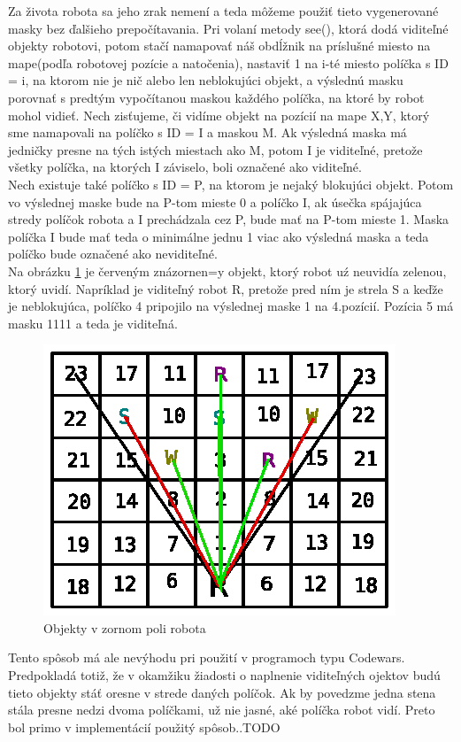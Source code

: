 Za života robota sa jeho zrak nemení a teda môžeme použiť tieto vygenerované masky bez ďalšieho prepočítavania. Pri volaní metody see(), ktorá dodá viditeľné objekty robotovi, potom stačí namapovať náš obdĺžnik na príslušné miesto na mape(podľa robotovej pozície a natočenia), nastaviť 1 na i-té miesto políčka s ID = i, na ktorom nie je nič alebo len neblokujúci objekt, a výslednú masku porovnať s predtým vypočítanou maskou každého políčka, na ktoré by robot mohol vidieť. Nech zisťujeme, či vidíme objekt na pozícií na mape X,Y, ktorý sme namapovali na políčko s ID = I a maskou M. Ak výsledná maska má jedničky presne na tých istých miestach ako M, potom I je viditeľné, pretože všetky políčka, na ktorých I záviselo, boli označené ako viditeľné. \\
Nech existuje také políčko s ID = P, na ktorom je nejaký blokujúci objekt. Potom vo výslednej maske bude na P-tom mieste 0 a políčko I, ak úsečka spájajúca stredy políčok robota a I prechádzala cez P, bude mať na P-tom mieste 1. Maska políčka I bude mať teda o minimálne jednu 1 viac ako výsledná maska a teda políčko bude označené ako neviditeľné.\\
Na obrázku \ref{visibleo} je červeným znázornen=y objekt, ktorý robot uź neuvidía zelenou, ktorý uvidí. Napríklad je viditeľný robot R, pretože pred ním je strela S a keďže je neblokujúca, políčko 4 pripojilo na výslednej maske 1 na 4.pozícií. Pozícia 5 má masku 1111 a teda je viditeľná.

\begin{figure}
\centering
\includegraphics[totalheight=0.4\textheight,width=.8\textwidth]{VisibleObjects}
\caption { Objekty v zornom poli robota}
\label{visibleo}
\end{figure}
\indent
\newline
\indent Tento spôsob má ale nevýhodu pri použití v programoch typu Codewars. Predpokladá totiž, že v okamžiku žiadosti o naplnenie viditeľných ojektov budú tieto objekty stáť oresne v strede daných políčok. Ak by povedzme jedna stena stála presne nedzi dvoma políčkami, už nie jasné, aké políčka robot vidí. Preto bol primo v implementácií použitý spôsob..TODO


